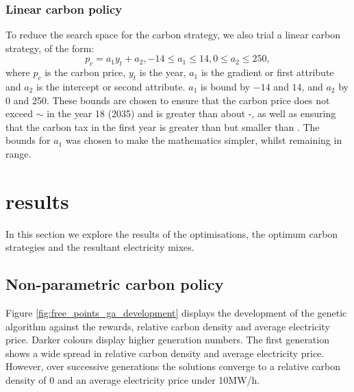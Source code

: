\documentclass[sigconf]{acmart}
\begin{document}
 \subsubsection{Linear carbon policy}
 \label{sssec:linear_carbon_strategy}
 To reduce the search space for the carbon strategy, we also trial a linear carbon strategy, of the form:
 \begin{equation}
 	p_c=a_1y_t+a_2, -14 \leq a_1\leq 14, 0 \leq a_2\leq 250,
 \end{equation}
 \noindent where $p_c$ is the carbon price, $y_t$ is the year, $a_1$ is the gradient or first attribute and $a_2$ is the intercept or second attribute. $a_1$ is bound by $-14$ and $14$, and $a_2$ by 0 and 250. These bounds are chosen to ensure that the carbon price does not exceed ${\sim}$ in the year 18 (2035) and is greater than about -, as well as ensuring that the carbon tax in the first year is greater than  but smaller than . The bounds for $a_1$ was chosen to make the mathematics simpler, whilst remaining in range.

\section{results}
\label{sec:results}

In this section we explore the results of the optimisations, the optimum carbon strategies and the resultant electricity mixes.

\subsection{Non-parametric carbon policy}
\label{sssec:result_non_parametric_strategy}

Figure \ref{fig:free_points_ga_development} displays the development of the genetic algorithm against the rewards, relative carbon density and average electricity price. Darker colours display higher generation numbers. The first generation shows a wide spread in relative carbon density and average electricity price. However, over successive generations the solutions converge to a relative carbon density of 0 and an average electricity price under \textsterling10MW/h. 
\end{document}
